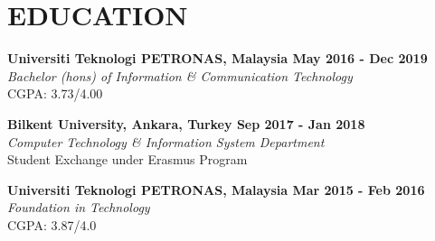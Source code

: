 \section{EDUCATION}
\textbf{Universiti Teknologi PETRONAS, Malaysia
\hfill{May 2016 - Dec 2019}} \\
{\sl Bachelor (hons) of Information \& Communication Technology} \\
\hfill CGPA: 3.73/4.00

\textbf{Bilkent University, Ankara, Turkey
\hfill{Sep 2017 - Jan 2018}} \\
{\sl Computer Technology \& Information System Department} \\
\hfill Student Exchange under Erasmus Program

\textbf{Universiti Teknologi PETRONAS, Malaysia 
\hfill{Mar 2015 - Feb 2016}} \\
{\sl Foundation in Technology} \\
\hfill CGPA: 3.87/4.0